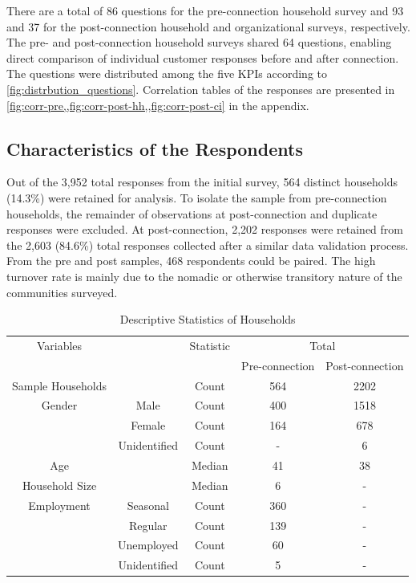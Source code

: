 There are a total of 86 questions for the pre-connection household survey and 93 and 37 for the post-connection household and organizational surveys, respectively. The pre- and post-connection household surveys shared 64 questions, enabling direct comparison of individual customer responses before and after connection. The questions were distributed among the five KPIs according to \cref{fig:distrbution_questions}. Correlation tables of the responses are presented in \cref{fig:corr-pre,,fig:corr-post-hh,,fig:corr-post-ci} in the appendix.

\subsection{Characteristics of the Respondents}
Out of the 3,952 total responses from the initial survey, 564 distinct households (14.3\%) were retained for analysis. To isolate the sample from pre-connection households, the remainder of observations at post-connection and duplicate responses were excluded. At post-connection, 2,202 responses were retained from the 2,603 (84.6\%) total responses collected after a similar data validation process. From the pre and post samples, 468 respondents could be paired. The high turnover rate is mainly due to the nomadic or otherwise transitory nature of the communities surveyed.

\begin{table}[th]
\centering
	\begin{tabular}{*5c} 
		\toprule
		Variables &  & Statistic  &\multicolumn{2}{c}{Total}\\
		& &  & Pre-connection & Post-connection\\
		
		\midrule
		Sample Households  & & Count & 564 & 2202 \\
		Gender  & Male & Count & 400 & 1518\\
				& Female & Count & 164 & 678\\
				& Unidentified & Count & - & 6\\
		Age  &  & Median & 41 & 38\\
		Household Size  &  & Median & 6 & - \\
		Employment & Seasonal & Count & 360 & - \\
				   & Regular & Count & 139 & - \\
				   & Unemployed & Count & 60 & - \\
				   & Unidentified & Count & 5 & -\\
				   
		\bottomrule
	\end{tabular}
\caption{Descriptive Statistics of Households}
\label{tab:desc-stats-hh}
\end{table}

